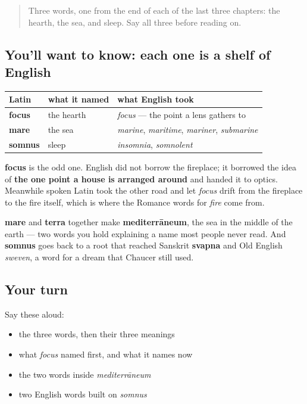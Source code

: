 \label{lesson:LA-C48-second-pass-three-closings}



\begin{quote}
Three words, one from the end of each of the last three chapters: the hearth, the sea, and sleep. Say all three before reading on.
\end{quote}

\subsection*{You'll want to know: each one is a shelf of English}
\noindent
\begin{tabularx}{\linewidth}{@{}>{\raggedright\arraybackslash}X>{\raggedright\arraybackslash}X>{\raggedright\arraybackslash}X@{}}
\toprule
\textbf{Latin} & \textbf{what it named} & \textbf{what English took} \\
\midrule
\textbf{focus} & the hearth & \emph{focus} — the point a lens gathers to \\
\textbf{mare} & the sea & \emph{marine}, \emph{maritime}, \emph{mariner}, \emph{submarine} \\
\textbf{somnus} & sleep & \emph{insomnia}, \emph{somnolent} \\
\bottomrule
\end{tabularx}

\textbf{focus} is the odd one. English did not borrow the fireplace; it borrowed the idea of \textbf{the one point a house is arranged around} and handed it to optics. Meanwhile spoken Latin took the other road and let \emph{focus} drift from the fireplace to the fire itself, which is where the Romance words for \emph{fire} come from.

\textbf{mare} and \textbf{terra} together make \textbf{mediterrāneum}, the sea in the middle of the earth — two words you hold explaining a name most people never read. And \textbf{somnus} goes back to a root that reached Sanskrit \textbf{svapna} and Old English \emph{sweven}, a word for a dream that Chaucer still used.

\subsection*{Your turn}
Say these aloud:

\begin{itemize}
\raggedright
  \item the three words, then their three meanings
  \item what \emph{focus} named first, and what it names now
  \item the two words inside \emph{mediterrāneum}
  \item two English words built on \emph{somnus}
\end{itemize}

